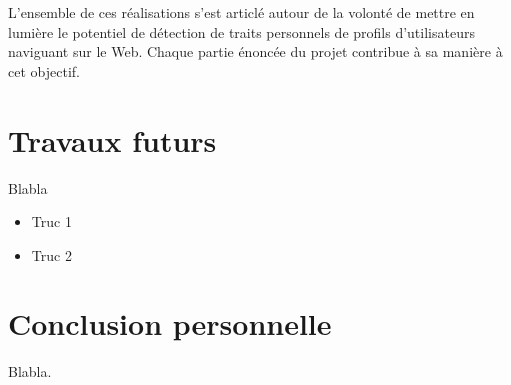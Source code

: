 		L'ensemble de ces réalisations s'est articlé autour de la volonté de mettre en lumière le potentiel de détection de traits personnels de profils d'utilisateurs naviguant sur le Web. Chaque partie énoncée du projet contribue à sa manière à cet objectif.

\section{Travaux futurs}

	Blabla
	\begin{itemize}
		\item Truc 1
		\item Truc 2
	\end{itemize}


\section{Conclusion personnelle}

	Blabla.